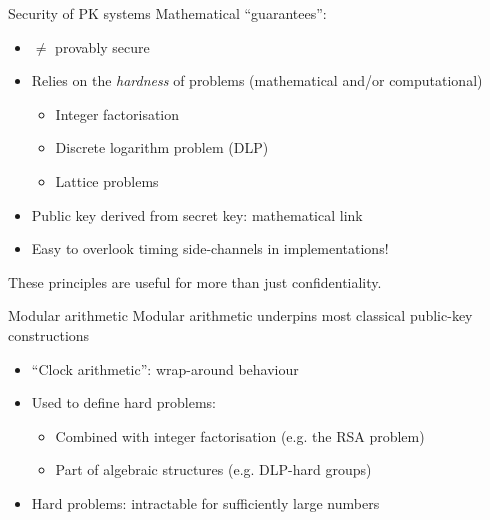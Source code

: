 \begin{frame}{Security of PK systems}
  Mathematical \enquote{guarantees}:
  \begin{itemize}[<+(1)->]
    \item $\neq$ provably secure
    \item Relies on the \emph{hardness} of problems (mathematical and/or computational)
    \begin{itemize}
      \item Integer factorisation
      \item Discrete logarithm problem (DLP)
      \item Lattice problems
    \end{itemize}
    \item Public key derived from secret key: mathematical link
    \item Easy to overlook timing side-channels in implementations!
  \end{itemize}

  \vspace*{1em}

  \pause
  These principles are useful for more than just confidentiality.
\end{frame}

\begin{frame}{Modular arithmetic}
  Modular arithmetic underpins most classical public-key constructions
  \begin{itemize}[<+(1)->]
    \item \enquote{Clock arithmetic}: wrap-around behaviour
    \item Used to define hard problems:
    \begin{itemize}
      \item Combined with integer factorisation (e.g. the RSA problem)
      \item Part of algebraic structures (e.g. DLP-hard groups)
    \end{itemize}
    \item Hard problems: intractable for sufficiently large numbers
  \end{itemize}
\end{frame}


